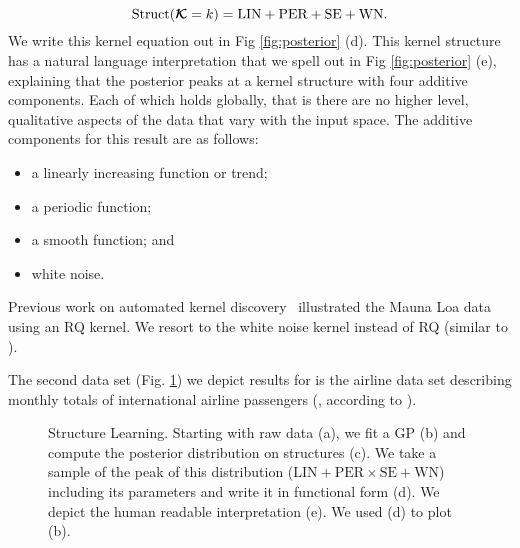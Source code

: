 \begin{equation}
\text{Struct}(\bm{\mathcal{K}}=k)=\text{LIN} + \text{PER} + \text{SE} + \text{WN}.
\end{equation}
We write this kernel equation out in Fig \ref{fig:posterior} (d).
This kernel structure has a natural language interpretation that we spell out in
Fig \ref{fig:posterior} (e), explaining that 
the posterior peaks at a kernel structure with four additive components.
Each of which holds globally, that is there are no higher level, qualitative aspects
of the data that vary with the input space. The additive components for this result are as follows:
\begin{itemize}
\item a linearly increasing function or trend; 
\item a periodic function;
\item a smooth function; and
\item white noise.
\end{itemize}
 



Previous work on automated kernel discovery~\citep{duvenaud2013structure} illustrated the Mauna Loa data using an RQ kernel.
We resort to the white noise kernel instead of RQ (similar to \citep{lloyd2014automatic}).


The second data set (Fig. \ref{fig:posterior_airline}) we depict results for is  the airline 
data set describing monthly totals of international airline passengers (\citealp{box2011time}, according to \citealp{duvenaud2013structure}). 
\begin{figure}
\centering

\caption{\footnotesize Structure Learning. Starting with raw data (a), we fit a \ac{GP}
(b) and compute the posterior distribution on structures (c). We take a sample
of the peak of this distribution ($\text{LIN}+\text{PER} \times \text{SE}+\text{WN}$)
including its parameters and write it in functional form (d). We depict the
human readable interpretation (e). We used (d) to plot (b).}\label{fig:posterior_airline}
\end{figure}

